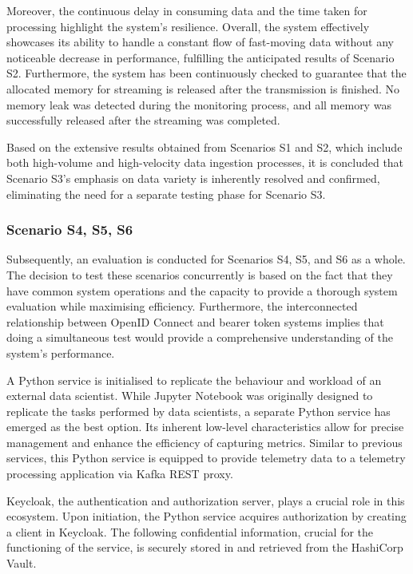 \documentclass[review]{elsarticle}
\begin{document}
Moreover, the continuous delay in consuming data and the time taken for processing highlight the system's resilience. Overall, the system effectively showcases its ability to handle a constant flow of fast-moving data without any noticeable decrease in performance, fulfilling the anticipated results of Scenario S2. Furthermore, the system has been continuously checked to guarantee that the allocated memory for streaming is released after the transmission is finished. No memory leak was detected during the monitoring process, and all memory was successfully released after the streaming was completed.

Based on the extensive results obtained from Scenarios S1 and S2, which include both high-volume and high-velocity data ingestion processes, it is concluded that Scenario S3's emphasis on data variety is inherently resolved and confirmed, eliminating the need for a separate testing phase for Scenario S3.

\subsubsection{Scenario S4, S5, S6}

Subsequently, an evaluation is conducted for Scenarios S4, S5, and S6 as a whole. The decision to test these scenarios concurrently is based on the fact that they have common system operations and the capacity to provide a thorough system evaluation while maximising efficiency. Furthermore, the interconnected relationship between OpenID Connect and bearer token systems implies that doing a simultaneous test would provide a comprehensive understanding of the system's performance.

A Python service is initialised to replicate the behaviour and workload of an external data scientist. While Jupyter Notebook was originally designed to replicate the tasks performed by data scientists, a separate Python service has emerged as the best option. Its inherent low-level characteristics allow for precise management and enhance the efficiency of capturing metrics. Similar to previous services, this Python service is equipped to provide telemetry data to a telemetry processing application via Kafka REST proxy. 

Keycloak, the authentication and authorization server, plays a crucial role in this ecosystem. Upon initiation, the Python service acquires authorization by creating a client in Keycloak. The following confidential information, crucial for the functioning of the service, is securely stored in and retrieved from the HashiCorp Vault. 
\end{document}
